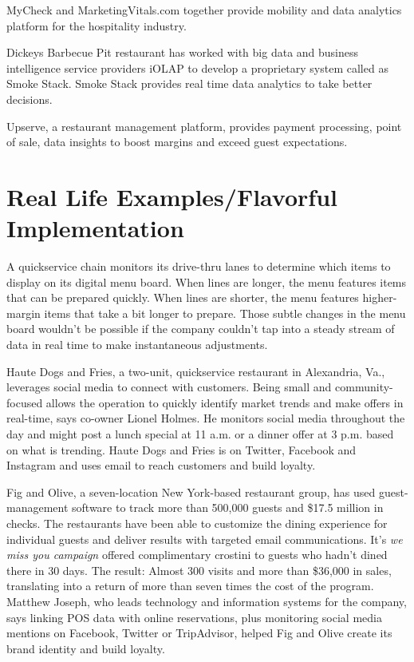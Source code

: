\documentclass[sigconf]{acmart}
\begin{document}
MyCheck and MarketingVitals.com together provide mobility and data analytics platform for the hospitality industry. \cite{www-buss} 

Dickeys Barbecue Pit restaurant has worked with big data and business intelligence service providers iOLAP to develop a proprietary system called as Smoke Stack. Smoke Stack provides real time data analytics to take better decisions. \cite{www-forbes}

Upserve, a restaurant management platform, provides payment processing, point of sale, data insights to boost margins and exceed guest expectations.\cite{www-bostonglobe}\cite{www-upserve}


\section{Real Life Examples/Flavorful Implementation}
A quickservice chain monitors its drive-thru lanes to determine which items to display on its digital menu board. When lines are longer, the menu features items that can be prepared quickly. When lines are shorter, the menu features higher-margin items that take a bit longer to prepare. Those subtle changes in the menu board wouldn't be possible if the company couldn't tap into a steady stream of data in real time to make instantaneous adjustments.\cite{www-restaurant}


Haute Dogs and Fries, a two-unit, quickservice restaurant in Alexandria, Va., leverages social media to connect with customers. Being small and community-focused allows the operation to quickly identify market trends and make offers in real-time, says co-owner Lionel Holmes. He monitors social media throughout the day and might post a lunch special at 11 a.m. or a dinner offer at 3 p.m. based on what is trending. Haute Dogs and Fries is on Twitter, Facebook and Instagram and uses email to reach customers and build loyalty.\cite{www-restaurant}


Fig and Olive, a seven-location New York-based restaurant group, has used guest-management software to track more than 500,000 guests and \$17.5 million in checks. The restaurants have been able to customize the dining experience for individual guests and deliver results with targeted email communications. It's \emph{we miss you campaign} offered complimentary crostini to guests who hadn't dined there in 30 days. The result: Almost 300 visits and more than \$36,000 in sales, translating into a return of more than seven times the cost of the program. Matthew Joseph, who leads technology and information systems for the company, says linking POS data with online reservations, plus monitoring social media mentions on Facebook, Twitter or TripAdvisor, helped Fig and Olive create its brand identity and build loyalty.\cite{www-restaurant}
\end{document}
